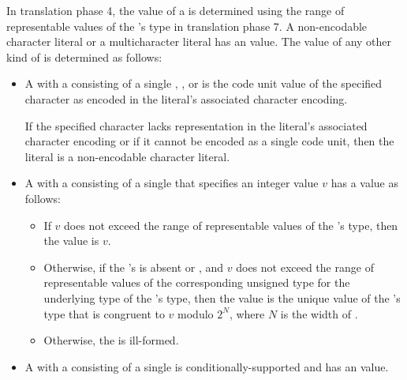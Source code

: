 \pnum
In translation phase 4,
the value of a  is determined
using the range of representable values
of the 's type in translation phase 7.
A non-encodable character literal or a multicharacter literal
has an
value.
The value of any other kind of 
is determined as follows:
\begin{itemize}
\item
A  with
a  consisting of a single
,
, or
is the code unit value of the specified character
as encoded in the literal's associated character encoding.
\begin{note}
If the specified character lacks
representation in the literal's associated character encoding or
if it cannot be encoded as a single code unit,
then the literal is a non-encodable character literal.
\end{note}
\item
A  with
a  consisting of
a single 
that specifies an integer value $v$ has a value as follows:
\begin{itemize}
\item
If $v$ does not exceed
the range of representable values of the 's type,
then the value is $v$.
\item
Otherwise,
if the 's 
is absent or , and
$v$ does not exceed the range of representable values of the corresponding unsigned type for the underlying type of the 's type,
then the value is the unique value of the 's type  that is congruent to $v$ modulo $2^N$, where $N$ is the width of .
\item
Otherwise, the  is ill-formed.
\end{itemize}
\item
A  with
a  consisting of
a single 
is conditionally-supported and
has an  value.
\end{itemize}

